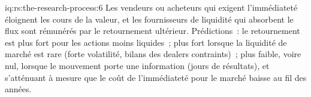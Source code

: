\begin{solution}{iq:rs:the-research-process:6}
Les vendeurs ou acheteurs qui exigent l'immédiateté éloignent les cours de la valeur, et les fournisseurs de liquidité qui absorbent le flux sont rémunérés par le
retournement ultérieur. Prédictions~: le retournement est plus fort pour les actions moins liquides~; plus fort lorsque la liquidité de marché est rare
(forte volatilité, bilans des dealers contraints)~; plus faible, voire nul, lorsque le mouvement porte une information (jours de résultats), et
s'atténuant à mesure que le coût de l'immédiateté pour le marché baisse au fil des années.
\end{solution}
